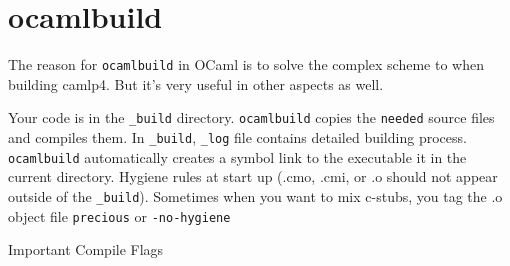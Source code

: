 
\section{ocamlbuild}

The reason for \verb|ocamlbuild| in OCaml is to solve the complex scheme to
when building camlp4. But it's very useful in other aspects as well.

Your code is in the \verb|_build| directory. \verb|ocamlbuild| copies
the \verb|needed| source files and compiles them.  In \verb|_build|,
\verb|_log| file contains detailed building process. \verb|ocamlbuild|
automatically creates a symbol link to the executable it in the
current directory.  Hygiene rules at start up (.cmo, .cmi, or .o
should not appear outside of the \verb|_build|). Sometimes when you
want to mix c-stubs, you tag the .o object file \verb|precious| or
\verb|-no-hygiene|


Important Compile Flags 

